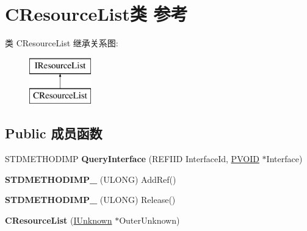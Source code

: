 \hypertarget{class_c_resource_list}{}\section{C\+Resource\+List类 参考}
\label{class_c_resource_list}
类 C\+Resource\+List 继承关系图\+:\begin{figure}[H]
\begin{center}
\leavevmode
\includegraphics[height=2.000000cm]{class_c_resource_list}
\end{center}
\end{figure}
\subsection*{Public 成员函数}
\begin{DoxyCompactItemize}
\item 
\mbox{\label{class_c_resource_list_a71dc0e33944adb7c44347393eb90c917}} 
S\+T\+D\+M\+E\+T\+H\+O\+D\+I\+MP {\bfseries Query\+Interface} (R\+E\+F\+I\+ID Interface\+Id, \hyperlink{interfacevoid}{P\+V\+O\+ID} $\ast$Interface)
\item 
\mbox{\label{class_c_resource_list_a99e12a46836a9f71b5b01f2151e124d2}} 
{\bfseries S\+T\+D\+M\+E\+T\+H\+O\+D\+I\+M\+P\+\_\+} (U\+L\+O\+NG) Add\+Ref()
\item 
\mbox{\label{class_c_resource_list_a7600d14c57bf720192fbb5993bf33491}} 
{\bfseries S\+T\+D\+M\+E\+T\+H\+O\+D\+I\+M\+P\+\_\+} (U\+L\+O\+NG) Release()
\item 
\mbox{\label{class_c_resource_list_ac9da321e215d81075f0917c7df0ea9fc}} 
{\bfseries C\+Resource\+List} (\hyperlink{interface_i_unknown}{I\+Unknown} $\ast$Outer\+Unknown)
\end{DoxyCompactItemize}
